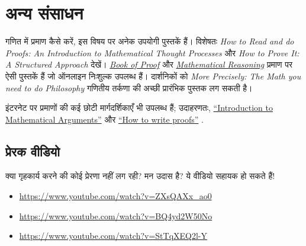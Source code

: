 \documentclass[../../../include/open-logic-section]{subfiles}
\begin{document}

\section{अन्य संसाधन}

गणित में प्रमाण कैसे करें, इस विषय पर अनेक उपयोगी पुस्तकें हैं। विशेषतः
\emph{How to Read and do Proofs: An Introduction to Mathematical Thought
Processes} \citep{Solow2013} और \emph{How to Prove It: A Structured
Approach} \citep{Velleman2019} देखें।
\href{http://www.people.vcu.edu/~rhammack/BookOfProof/BookOfProof.pdf}{\emph{Book
of Proof}} \citep{Hammack2013} और
\href{https://scholarworks.gvsu.edu/books/7/}{\emph{Mathematical
Reasoning}} \citep{Sandstrum2019} प्रमाण पर ऐसी पुस्तकें हैं जो ऑनलाइन
निःशुल्क उपलब्ध हैं। दार्शनिकों को
\emph{More
Precisely: The Math you need to do Philosophy} \citep{Steinhart2018}
गणितीय तर्कणा की अच्छी प्रारंभिक पुस्तक लग सकती है।

इंटरनेट पर प्रमाणों की कई छोटी मार्गदर्शिकाएँ भी उपलब्ध हैं; उदाहरणतः,
\href{https://math.berkeley.edu/~hutching/teach/proofs.pdf}{``Introduction
  to Mathematical Arguments''} \citep{Hutchings2003} और
\href{https://eugeniacheng.com/wp-content/uploads/2017/02/cheng-proofguide.pdf}{``How to
  write proofs''} \citep{Cheng2004}.

\subsection{प्रेरक वीडियो}

क्या गृहकार्य करने की कोई प्रेरणा नहीं लग रही? मन उदास है? ये वीडियो सहायक
हो सकते हैं!

\begin{itemize}
\item \url{https://www.youtube.com/watch?v=ZXsQAXx_ao0}
\item \url{https://www.youtube.com/watch?v=BQ4yd2W50No}
\item \url{https://www.youtube.com/watch?v=StTqXEQ2l-Y}
\end{itemize}
\end{document}
